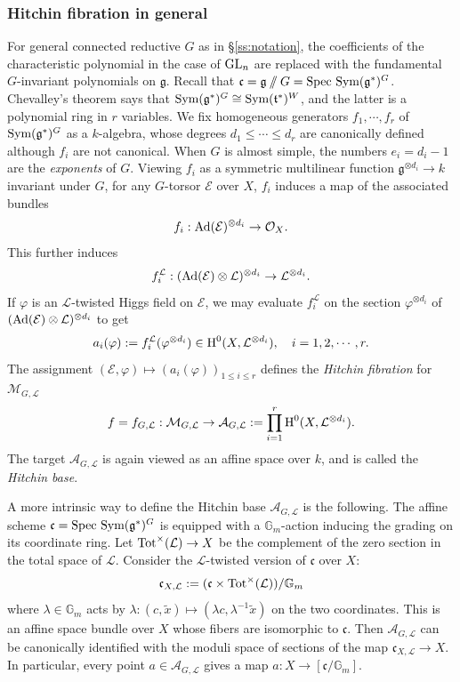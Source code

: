 \documentclass[]{pcmi}
\let\oldsubsubsection\subsubsection
\renewcommand{\subsubsection}[1]{%
\setcounter{subsubsection}{\value{equation}}%
\oldsubsubsection{#1}%
\refstepcounter{equation}%
}
\theoremstyle{plain}
\theoremstyle{definition}
\def\GG{\mathbb{G}}
\def\calA{\mathcal{A}}
\def\calE{\mathcal{E}}
\def\calL{\mathcal{L}}
\def\calM{\mathcal{M}}
\def\calO{\mathcal{O}}
\newcommand\frc{\mathfrak{c}}
\newcommand\frg{\mathfrak{g}}
\newcommand\frt{\mathfrak{t}}
\newcommand\Spec{\textup{Spec}\ }
\newcommand\Sym{\textup{Sym}}
\newcommand\Tot{\textup{Tot}}
\newcommand\GL{\textup{GL}}
\newcommand{\Gm}{\GG_m}
\newcommand{\Ad}{\textup{Ad}}
\renewcommand{\l}{\lambda}
\newcommand{\wt}{\widetilde}
\newcommand{\cohog}[2]{\textup{H}^{#1}({#2})}     %
\begin{document}
\subsubsection{Hitchin fibration in general}\label{sss:Hit fib general} For general connected reductive $G$ as in \S\ref{ss:notation}, the coefficients of the characteristic polynomial in the case of $\GL_{n}$ are replaced with the fundamental $G$-invariant polynomials on $\frg$. Recall that $\frc=\frg\sslash G=\Spec\Sym(\frg^{*})^{G}$. Chevalley's theorem says that $\Sym(\frg^{*})^{G}\cong\Sym(\frt^{*})^{W}$, and the latter is a polynomial ring in $r$ variables. We fix homogeneous generators $f_{1},\cdots, f_{r}$ of $\Sym(\frg^{*})^{G}$ as a $k$-algebra, whose degrees  $d_{1}\leq \cdots \leq d_{r}$ are canonically defined although $f_{i}$ are not canonical.  When $G$ is almost simple, the numbers $e_{i}=d_{i}-1$ are the {\em exponents} of $G$. Viewing $f_{i}$ as a symmetric multilinear function $\frg^{\otimes d_{i}}\to k$ invariant under $G$, for any $G$-torsor $\calE$ over $X$, $f_{i}$ induces a map of the associated bundles
\begin{equation*}
f_{i}: \Ad(\calE)^{\otimes d_{i}}\to\calO_{X}.
\end{equation*}
This further induces
\begin{equation*}
f^{\calL}_{i}:(\Ad(\calE)\otimes\calL)^{\otimes d_{i}}\to\calL^{\otimes d_{i}}.
\end{equation*}
If $\varphi$ is an $\calL$-twisted Higgs field on $\calE$,  we may evaluate $f^{\calL}_{i}$ on the section $\varphi^{\otimes d_{i}}$ of $(\Ad(\calE)\otimes\calL)^{\otimes d_{i}}$ to get
\begin{equation*}
a_{i}(\varphi):=f^{\calL}_{i}(\varphi^{\otimes d_{i}})\in\cohog{0}{X,\calL^{\otimes d_{i}}},  \quad i=1,2,\cdots, r.
\end{equation*}
The assignment $(\calE,\varphi)\mapsto(a_{i}(\varphi))_{1\leq i\leq r}$ defines the {\em Hitchin fibration} for $\calM_{G,\calL}$
\begin{equation*}
f=f_{G,\calL}: \calM_{G,\calL}\to \calA_{G,\calL}:=\prod_{i=1}^{r}\cohog{0}{X,\calL^{\otimes d_{i}}}.
\end{equation*}
The target $\calA_{G,\calL}$ is again viewed as an affine space over $k$, and is called the {\em  Hitchin base}.

A more intrinsic way to define the Hitchin base $\calA_{G,\calL}$ is the following. The affine scheme $\frc=\Spec \Sym(\frg^{*})^{G}$ is  equipped with a $\Gm$-action inducing the grading on its coordinate ring. Let $\Tot^{\times}(\calL)\to X$ be the complement of the zero section in the total space of $\calL$. Consider the $\calL$-twisted version of $\frc$ over $X$:
\begin{equation*}
\frc_{X,\calL}:=(\frc\times \Tot^{\times}(\calL))/\Gm
\end{equation*}
where $\l\in\Gm$ acts by $\l: (c,\wt{x})\mapsto (\l c, \l^{-1}\wt{x})$ on the two coordinates. This is an affine space bundle over $X$ whose fibers are isomorphic to $\frc$. Then $\calA_{G,\calL}$ can be canonically identified with the moduli space of sections of the map $\frc_{X,\calL}\to X$. In particular, every point $a\in\calA_{G,\calL}$ gives a map $a:X\to [\frc/\Gm]$.
\end{document}
